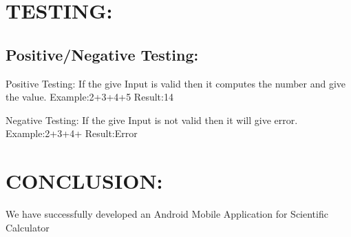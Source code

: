 \documentclass[11pt]{article}
\begin{document}
\section{TESTING:}
	\subsection{Positive/Negative Testing:}
	Positive Testing:\newline
	If the give Input is valid then it computes the number and give the value.\newline
	Example:2+3+4+5 \newline
	Result:14\newline

	Negative Testing:\newline
	If the give Input is not valid then it will give error.\newline
	Example:2+3+4+ \newline
	Result:Error
	
\section{CONCLUSION:}
We have successfully developed an Android Mobile Application for Scientific Calculator
\end{document}
